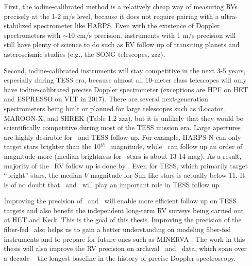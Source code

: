 First, the iodine-calibrated method is a relatively cheap way of
measuring RVs precisely at the 1-2 m/s level, because it does not
require pairing with a ultra-stabilized spectrometer like HARPS. Even
with the existence of Doppler spectrometers with $\sim$10 cm/s
precision, instruments with 1 m/s precision will still have plenty of
science to do such as RV follow up of transiting planets and
asteroseismic studies (e.g., the SONG telescopes, zzz). 

Second, iodine-calibrated instruments will stay competitive in the next
3-5 years, especially during TESS era, because almost all 10-meter
class telescopes will only have iodine-calibrated precise Doppler
spectrometer (exceptions are HPF on HET and ESPRESSO on VLT in
2017). There are several next-generation spectrometers being built or
planned for large telescopes such as iLocator, MAROON-X, and SHREK
(Table 1.2 zzz), but it is unlikely that they would be scientifically
competitive during most of the TESS mission era. Large apertures are
highly desirable for \kepler\ and TESS follow up. For example, HARPS-N
can only target stars brighter than the 10$^{th}$ \kepler\ magnitude,
while \keck\ can follow up an order of magnitude more (median
brightness for \kepler\ stars is about 13-14 mag). As a result,
majority of the \kepler\ RV follow up is done by \keck. Even for TESS,
which primarily target ``bright'' stars, the median $V$ magnitude for
Sun-like stars is actually below 11. It is of no doubt that
\het\ and \keck\ will play an important role in TESS follow up.

Improving the precision of \het\ and \keck\ will enable more efficient
follow up on TESS targets and also benefit the independent long-term
RV surveys being carried out at HET and Keck. This is the goal of this
thesis. Improving the precision of the fiber-fed \het\ also helps us
to gain a better understanding on modeling fiber-fed instruments and
to prepare for future ones such as MINERVA \citep{minerva}. The work
in this thesis will also improve the RV precision on archival \het\
and \keck\ data, which span over a decade -- the longest baseline in
the history of precise Doppler spectroscopy. 

